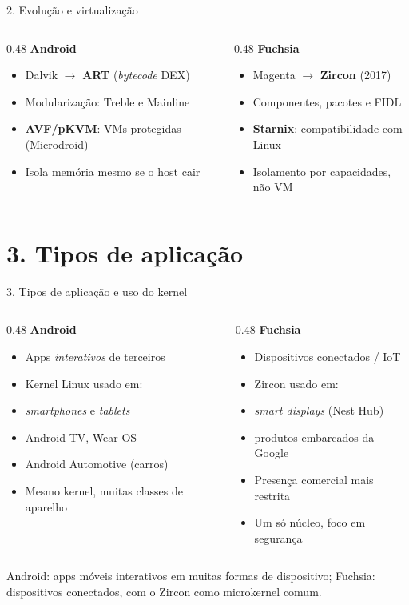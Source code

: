 \documentclass[aspectratio=169,11pt]{beamer}
\newcommand{\ANDROID}{\textbf{\color{androidVerde}Android}}
\newcommand{\FUCHSIA}{\textbf{\color{fuchsiaCor}Fuchsia}}
\newcommand{\comparar}[2]{%
  \begin{columns}[T,onlytextwidth]
    \begin{column}{0.48\textwidth}
      \ANDROID\par\smallskip
      \begin{itemize}\footnotesize #1 \end{itemize}
    \end{column}
    \begin{column}{0.48\textwidth}
      \FUCHSIA\par\smallskip
      \begin{itemize}\footnotesize #2 \end{itemize}
    \end{column}
  \end{columns}%
}
\begin{document}
\begin{frame}{2. Evolução e virtualização}
  \comparar{
    \item Dalvik $\rightarrow$ \textbf{ART} (\emph{bytecode} DEX)
    \item Modularização: Treble e Mainline
    \item \textbf{AVF/pKVM}: VMs protegidas (Microdroid)
    \item Isola memória mesmo se o host cair
  }{
    \item Magenta $\rightarrow$ \textbf{Zircon} (2017)
    \item Componentes, pacotes e FIDL
    \item \textbf{Starnix}: compatibilidade com Linux
    \item Isolamento por capacidades, não VM
  }
\end{frame}

\section{3. Tipos de aplicação}

\begin{frame}{3. Tipos de aplicação e uso do kernel}
  \comparar{
    \item Apps \emph{interativos} de terceiros
    \item Kernel Linux usado em:
    \item \quad \emph{smartphones} e \emph{tablets}
    \item \quad Android TV, Wear OS
    \item \quad Android Automotive (carros)
    \item Mesmo kernel, muitas classes de aparelho
  }{
    \item Dispositivos conectados / IoT
    \item Zircon usado em:
    \item \quad \emph{smart displays} (Nest Hub)
    \item \quad produtos embarcados da Google
    \item Presença comercial mais restrita
    \item Um só núcleo, foco em segurança
  }
  \vfill
  {\scriptsize\color{gray} Android: apps móveis interativos em muitas formas de dispositivo; Fuchsia: dispositivos conectados, com o Zircon como microkernel comum.}
\end{frame}
\end{document}
